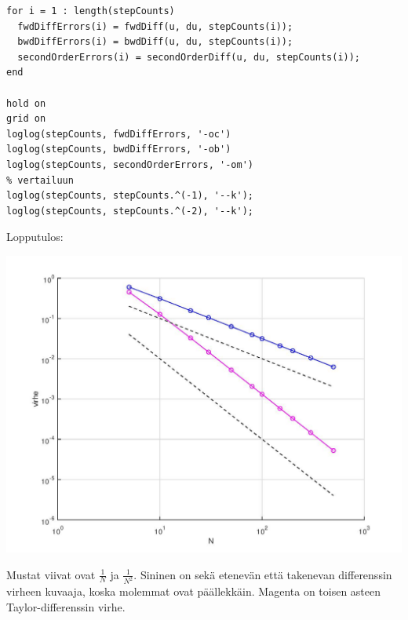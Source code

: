 \documentclass{article}
\begin{document}
\begin{verbatim}
for i = 1 : length(stepCounts)
  fwdDiffErrors(i) = fwdDiff(u, du, stepCounts(i));
  bwdDiffErrors(i) = bwdDiff(u, du, stepCounts(i));
  secondOrderErrors(i) = secondOrderDiff(u, du, stepCounts(i));
end

hold on
grid on
loglog(stepCounts, fwdDiffErrors, '-oc')
loglog(stepCounts, bwdDiffErrors, '-ob')
loglog(stepCounts, secondOrderErrors, '-om')
% vertailuun
loglog(stepCounts, stepCounts.^(-1), '--k');
loglog(stepCounts, stepCounts.^(-2), '--k');
\end{verbatim}

Lopputulos:

\includegraphics[width=\textwidth]{w3_5.jpg}

Mustat viivat ovat $\frac{1}{N}$ ja $\frac{1}{N^2}$. Sininen on sekä etenevän
että takenevan differenssin virheen kuvaaja, koska molemmat ovat päällekkäin.
Magenta on toisen asteen Taylor-differenssin virhe.
\end{document}
